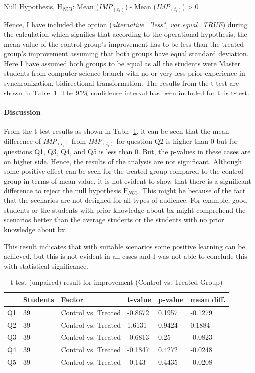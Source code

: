 Null Hypothesis, {H$_{NU3}$}: Mean (\textit{IMP$_{(c_i)}$}) - Mean (\textit{IMP$_{(t_i)}$}) > 0

Hence, I have included the option (\textit{alternative="less", var.equal=TRUE}) during the calculation which signifies that according to the operational hypothesis, the mean value of the control group's improvement has to be less than the treated group's improvement assuming that both groups have equal standard deviation. Here I have assumed both groups to be equal as all the students were Master students from computer science branch with no or very less prior experience in synchronization, bidirectional transformation. The results from the t-test are shown in Table~\ref{tab:t-test_controltreated}. The 95\% confidence interval has been included for this t-test.

\paragraph{Discussion}
From the t-test results as shown in Table~\ref{tab:t-test_controltreated}, it can be seen that the mean difference of \textit{IMP$_{(c_i)}$} from \textit{IMP$_{(t_i)}$} for question Q2 is higher than 0 but for questions Q1, Q3, Q4, and Q5 is less than 0. But, the p-values in these cases are on higher side. Hence, the results of the analysis are not significant. Although some positive effect can be seen for the treated group compared to the control group in terms of mean value, it is not evident to show that there is a significant difference to reject the null hypothesis {H$_{NU3}$}. This might be because of the fact that the scenarios are not designed for all types of audience. For example, good students or the students with prior knowledge about bx might comprehend the scenarios better than the average students or the students with no prior knowledge about bx.

This result indicates that with suitable scenarios some positive learning can be achieved, but this is not evident in all cases and I was not able to conclude this with statistical significance.

\begin{table}[ht]
	\centering	
	\begin{tabular}{|p{1cm}|p{1.5cm}|p{4.5cm}|p{1.5cm}|p{1.5cm}|p{1.5cm}|}
		\hline
		\rowcolor[gray]{.8}	
		\textbf{} & \textbf{Students} & \textbf{Factor} & \textbf{t-value} & \textbf{p-value} & \textbf{mean diff.}\\
		\hline
		Q1 & 39 & Control vs. Treated & -0.8672 & 0.1957 & -0.1279\\
		\hline
		Q2 & 39 & Control vs. Treated & 1.6131 & 0.9424 & 0.1884\\
		\hline
		Q3 & 39 & Control vs. Treated & -0.6813 & 0.25 & -0.0823\\
		\hline	
		Q4 & 39 & Control vs. Treated & -0.1847 & 0.4272 & -0.0248\\
		\hline
		Q5 & 39 & Control vs. Treated & -0.143 & 0.4435 & -0.0208\\
		\hline			
	\end{tabular}
	\caption{t-test (unpaired) result for improvement (Control vs. Treated Group)}
	\label{tab:t-test_controltreated}
\end{table}
